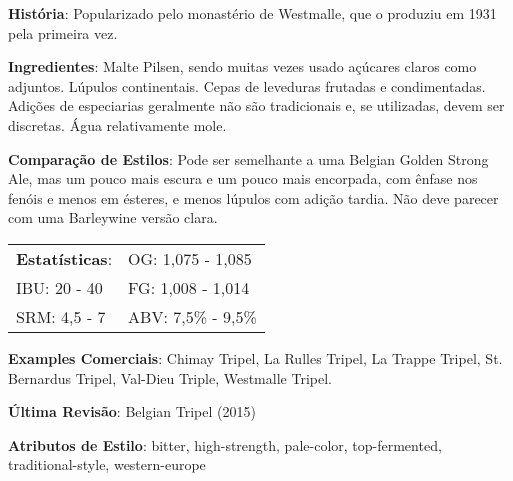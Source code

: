 \textbf{História}: Popularizado pelo monastério de Westmalle, que o produziu em 1931 pela primeira vez.

\textbf{Ingredientes}: Malte Pilsen, sendo muitas vezes usado açúcares claros como adjuntos. Lúpulos continentais. Cepas de leveduras frutadas e condimentadas. Adições de especiarias geralmente não são tradicionais e, se utilizadas, devem ser discretas. Água relativamente mole.

\textbf{Comparação de Estilos}: Pode ser semelhante a uma Belgian Golden Strong Ale, mas um pouco mais escura e um pouco mais encorpada, com ênfase nos fenóis e menos em ésteres, e menos lúpulos com adição tardia. Não deve parecer com uma Barleywine versão clara.

\begin{tabular}{@{}p{35mm}p{35mm}@{}}
  \textbf{Estatísticas}: & OG: 1,075 - 1,085 \\
  IBU: 20 - 40  & FG: 1,008 - 1,014  \\
  SRM: 4,5 - 7  & ABV: 7,5\% - 9,5\%
\end{tabular}

\textbf{Examples Comerciais}: Chimay Tripel, La Rulles Tripel, La Trappe Tripel, St. Bernardus Tripel, Val-Dieu Triple, Westmalle Tripel.

\textbf{Última Revisão}: Belgian Tripel (2015)

\textbf{Atributos de Estilo}: bitter, high-strength, pale-color, top-fermented, traditional-style, western-europe

